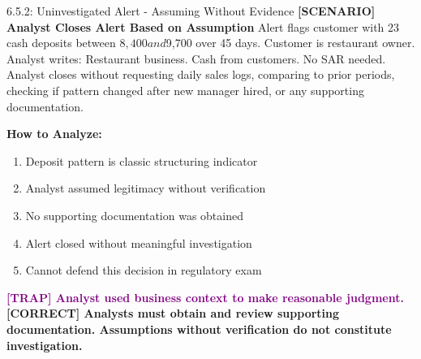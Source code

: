 \documentclass[11pt,a4paper]{beamer}
\newcommand{\trap}[1]{\textcolor{purple}{\textbf{[TRAP] #1}}}
\newcommand{\correct}[1]{\textcolor{green!50!black}{\textbf{[CORRECT] #1}}}
\newcommand{\scenario}[1]{\textcolor{blue!70!black}{\textbf{[SCENARIO] #1}}}
\begin{document}
\begin{frame}{6.5.2: Uninvestigated Alert - Assuming Without Evidence}
	\scenario{Analyst Closes Alert Based on Assumption}
	Alert flags customer with 23 cash deposits between $8,400 and $9,700 over 45 days. Customer is restaurant owner. Analyst writes: Restaurant business. Cash from customers. No SAR needed. Analyst closes without requesting daily sales logs, comparing to prior periods, checking if pattern changed after new manager hired, or any supporting documentation.
	
	\vspace{0.1cm}
	\textbf{How to Analyze:}
	\begin{enumerate}
		\item Deposit pattern is classic structuring indicator
		\item Analyst assumed legitimacy without verification
		\item No supporting documentation was obtained
		\item Alert closed without meaningful investigation
		\item Cannot defend this decision in regulatory exam
	\end{enumerate}
	\trap{Analyst used business context to make reasonable judgment.}
	\correct{Analysts must obtain and review supporting documentation. Assumptions without verification do not constitute investigation.}
\end{frame}
\end{document}
